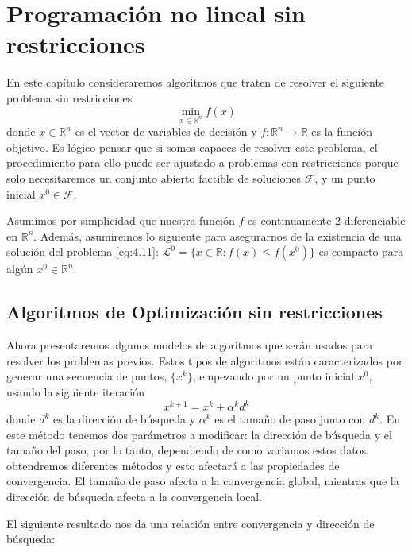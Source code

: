 \chapter{Programación no lineal sin restricciones}

En este capítulo consideraremos algoritmos que traten de resolver el siguiente problema sin restricciones
\begin{equation}
\min_{x\in\mathbb{R}^n}f(x) 
\label{eq:4.11}
\end{equation}
donde $x\in\mathbb{R}^n$ es el vector de variables de decisión y $f:\mathbb{R}^n\xrightarrow{}{}\mathbb{R}$ es la función objetivo. 
Es lógico pensar que si somos capaces de resolver este problema, el procedimiento para ello puede ser ajustado a problemas con restricciones porque solo necesitaremos un conjunto abierto factible de soluciones $\mathcal{F}$, y un punto inicial $x^0\in\mathcal{F}$.

Asumimos por simplicidad que nuestra función $f$ es continuamente 2-diferenciable en $\mathbb{R}^n$. 
Además, asumiremos lo siguiente para asegurarnos de la existencia de una solución del problema \ref{eq:4.11}: $\mathcal{L}^0 = \{x\in\mathbb{R}:f(x)\leq f(x^0)\}$ es compacto para algún $x^0\in\mathbb{R}^n$.

\section{Algoritmos de Optimización sin restricciones}

Ahora presentaremos algunos modelos de algoritmos que serán usados para resolver los problemas previos. 
Estos tipos de algoritmos están caracterizados por generar una secuencia de puntos, $\{x^k\}$, empezando por un punto inicial $x^0$, usando la siguiente iteración
\begin{equation}
x^{k+1} = x^k + \alpha^kd^k
\label{eq:4.12}
\end{equation}
donde $d^k$ es la dirección de búsqueda y $\alpha^k$ es el tamaño de paso junto con $d^k$. 
En este método tenemos dos parámetros a modificar: la dirección de búsqueda y el tamaño del paso, por lo tanto, dependiendo de como variamos estos datos, obtendremos diferentes métodos y esto afectará a las propiedades de convergencia. 
El tamaño de paso afecta a la convergencia global, mientras que la dirección de búsqueda afecta a la convergencia local. 

El siguiente resultado nos da una relación entre convergencia y dirección de búsqueda:

